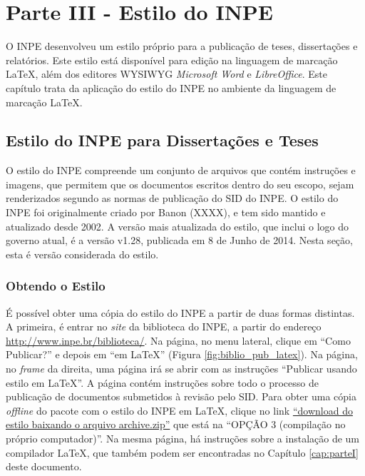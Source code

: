 \chapter{Parte III - Estilo do INPE}
\label{cap:parteIII}

O INPE desenvolveu um estilo próprio para a publicação de teses, dissertações e relatórios. Este estilo está disponível para edição na linguagem de marcação \LaTeX{}, além dos editores WYSIWYG \textit{Microsoft Word} e \textit{LibreOffice}. Este capítulo trata da aplicação do estilo do INPE no ambiente da linguagem de marcação \LaTeX{}.

\section{Estilo do INPE para Dissertações e Teses}

O estilo do INPE compreende um conjunto de arquivos que contém instruções e imagens, que permitem que os documentos escritos dentro do seu escopo, sejam renderizados segundo as normas de publicação do SID do INPE. O estilo do INPE foi originalmente criado por Banon (XXXX), e tem sido mantido e atualizado desde 2002. A versão mais atualizada do estilo, que inclui o logo do governo atual, é a versão v1.28, publicada em 8 de Junho de 2014. Nesta seção, esta é versão considerada do estilo.

\subsection*{Obtendo o Estilo}
\label{sec:obter}

É possível obter uma cópia do estilo do INPE a partir de duas formas distintas. A primeira, é entrar no \textit{site} da biblioteca do INPE, a partir do endereço \url{http://www.inpe.br/biblioteca/}. Na página, no menu lateral, clique em ``Como Publicar?'' e depois em ``em \LaTeX{}'' (Figura \ref{fig:biblio_pub_latex}). Na página, no \textit{frame} da direita, uma página irá se abrir com as instruções ``Publicar usando estilo em \LaTeX{}''. A página contém instruções sobre todo o processo de publicação de documentos submetidos à revisão pelo SID. Para obter uma cópia \textit{offline} do pacote com o estilo do INPE em \LaTeX{}, clique no link \href{http://mtc-m16c.sid.inpe.br/archive.cgi/sid.inpe.br/iris@1905/2005/08.25.14.01}{``download do estilo baixando o arquivo archive.zip''} que está na ``OPÇÃO 3 (compilação no próprio computador)''. Na mesma página, há instruções sobre a instalação de um compilador \LaTeX{}, que também podem ser encontradas no Capítulo \ref{cap:parteI} deste documento.

